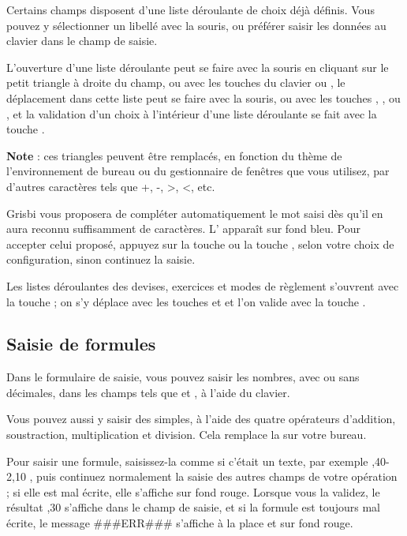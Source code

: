 Certains champs disposent d'une liste déroulante de choix déjà définis. Vous pouvez y sélectionner un libellé avec la souris, ou préférer saisir les données au clavier dans le champ de saisie.

L'ouverture d'une liste déroulante peut se faire avec la souris en cliquant sur le petit triangle à droite du champ, ou avec les touches du clavier  ou , le déplacement dans cette liste peut se faire avec la souris, ou avec les touches , ,  ou , et la validation d'un choix à l'intérieur d'une liste déroulante se fait avec la touche .

\textbf{Note} : ces triangles peuvent être remplacés, en fonction du thème de l'environnement de bureau ou du gestionnaire de fenêtres que vous utilisez, par d'autres caractères tels que +, -, >, <, etc.

Grisbi vous proposera de compléter automatiquement le mot saisi dès qu'il en aura reconnu suffisamment de caractères. L' apparaît sur fond bleu{\couleur}. Pour accepter celui proposé, appuyez sur la touche  ou la touche , selon votre choix de configuration, sinon continuez la saisie.

Les listes déroulantes des devises, exercices et modes de règlement s'ouvrent avec la touche  ; on s'y déplace  avec les touches  et  et l'on  valide avec la touche .


\subsection{Saisie de formules\label{transactions-new-numbers}}

Dans le formulaire de saisie, vous pouvez saisir les nombres, avec ou sans décimales, dans les champs tels que  et , à l'aide du clavier.

Vous pouvez aussi y saisir des  simples, à l'aide des quatre opérateurs d'addition, soustraction, multiplication et division. Cela remplace la  sur votre bureau.

Pour saisir une formule, saisissez-la comme si c'était un texte, par exemple ,40-2,10\fg{} , puis continuez normalement la saisie des autres champs de votre opération ; si elle est mal écrite, elle s'affiche sur fond rouge{\couleur}. Lorsque vous la validez, le résultat ,30 \fg{} s'affiche dans le champ de saisie, et si la formule est toujours mal écrite, le message \og \#\#\#ERR\#\#\# \fg{} s'affiche à la place et sur fond rouge{\couleur}.

